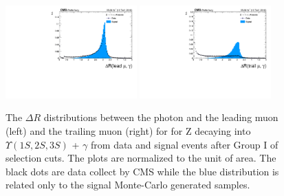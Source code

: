 \begin{figure}[!htbp]
\begin{center}
\includegraphics[width=0.45\textwidth]{figures_and_tables/outputPlots/ZtoUpsilon_Cat0_ZZZZZ/au/data_x_mc/noKinCuts/h_noKin_deltaR_Leading_Photon}\hspace*{1.cm}
\includegraphics[width=0.45\textwidth]{figures_and_tables/outputPlots/ZtoUpsilon_Cat0_ZZZZZ/au/data_x_mc/noKinCuts/h_noKin_deltaR_Trailing_Photon}\end{center}\vspace*{-.5cm}
\caption{The $\Delta R$ distributions between the photon and the leading muon (left) and the trailing muon (right) for for Z decaying into $\Upsilon(1S,2S,3S)$ + $\gamma$ from data and signal events after Group I of selection cuts. The plots are normalized to the unit of area. The black dots are data collect by CMS while the blue distribution is related only to the signal Monte-Carlo generated samples.}
\label{fig:deltaR_ZtoUpsilon_Cat0}
\end{figure}

